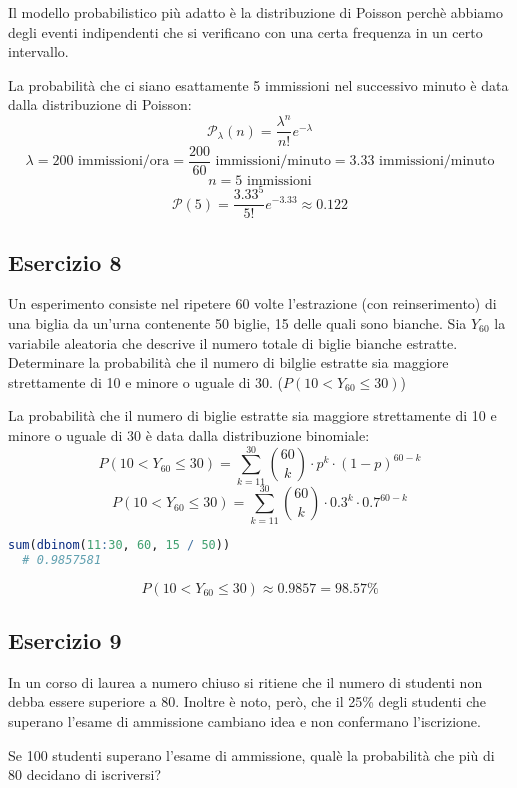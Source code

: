 \documentclass[a4paper]{article}
\theoremstyle{break}
\theoremstyle{break}
\theoremstyle{break}
\theoremstyle{break}
\begin{document}
\vspace{1em}
\noindent Il modello probabilistico più adatto è la distribuzione di Poisson perchè
abbiamo degli eventi indipendenti che si verificano con una certa frequenza in un
certo intervallo.

\noindent La probabilità che ci siano esattamente 5 immissioni nel successivo minuto è
data dalla distribuzione di Poisson:
\[
	\mathcal{P}_{\lambda}(n) = \frac{\lambda^n}{n!}e^{-\lambda}
\]
\[
	\lambda = 200 \text{ immissioni/ora} = \frac{200}{60} \text{ immissioni/minuto} = 3.33 \text{ immissioni/minuto}
\]
\[
	n = 5 \text{ immissioni}
\]
\[
	\mathcal{P}(5) = \frac{3.33^5}{5!}e^{-3.33} \approx 0.122
\]

\subsection{Esercizio 8}
Un esperimento consiste nel ripetere 60 volte l'estrazione (con reinserimento) di una
biglia da un'urna contenente 50 biglie, 15 delle quali sono bianche. Sia \( Y_{60} \) la
variabile aleatoria che descrive il numero totale di biglie bianche estratte. Determinare
la probabilità che il numero di bilglie estratte sia maggiore strettamente di 10 e minore
o uguale di 30. (\( P(10 < Y_{60} \le 30) \))

\vspace{1em}
\noindent La probabilità che il numero di biglie estratte sia maggiore strettamente di 10 e
minore o uguale di 30 è data dalla distribuzione binomiale:
\[
	P(10 < Y_{60} \le 30) = \sum_{k=11}^{30} \binom{60}{k} \cdot p^k \cdot (1-p)^{60-k}
\]
\[
	P(10 < Y_{60} \le 30) = \sum_{k=11}^{30} \binom{60}{k} \cdot 0.3^k \cdot 0.7^{60-k}
\]
\begin{lstlisting}[language=R]
  sum(dbinom(11:30, 60, 15 / 50))
  # 0.9857581
\end{lstlisting}
\[
	P(10 < Y_{60} \le 30) \approx 0.9857 = 98.57\%
\]

\subsection{Esercizio 9}
In un corso di laurea a numero chiuso si ritiene che il numero di studenti non debba
essere superiore a 80. Inoltre è noto, però, che il 25\% degli studenti che superano
l'esame di ammissione cambiano idea e non confermano l'iscrizione.

\noindent Se 100 studenti superano l'esame di ammissione, qualè la probabilità che più di
80 decidano di iscriversi?
\end{document}
